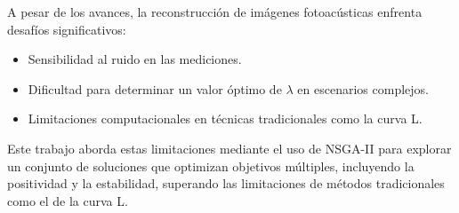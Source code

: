 A pesar de los avances, la reconstrucción de imágenes fotoacústicas enfrenta desafíos significativos:
\begin{itemize}
    \item Sensibilidad al ruido en las mediciones.
    \item Dificultad para determinar un valor óptimo de $\lambda$ en escenarios complejos.
    \item Limitaciones computacionales en técnicas tradicionales como la curva L.
\end{itemize}

Este trabajo aborda estas limitaciones mediante el uso de NSGA-II para explorar un conjunto de soluciones que optimizan objetivos múltiples, incluyendo la positividad y la estabilidad, superando las limitaciones de métodos tradicionales como el de la curva L.


